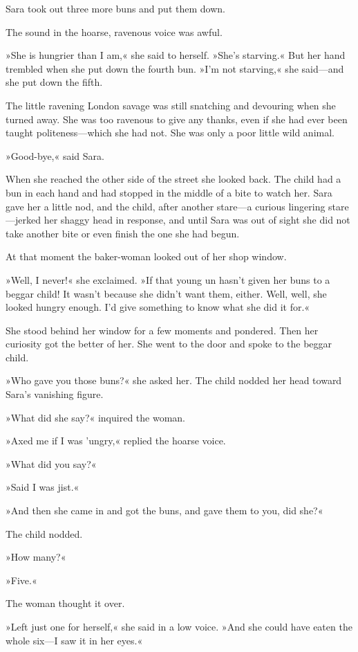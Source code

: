 Sara took out three more buns and put them down.

The sound in the hoarse, ravenous voice was awful.

»She is hungrier than I am,« she said to herself. »She's starving.« But her hand trembled when she put down the fourth bun. »I'm not starving,« she said—and she put down the fifth.

The little ravening London savage was still snatching and devouring when she turned away. She was too ravenous to give any thanks, even if she had ever been taught politeness—which she had not. She was only a poor little wild animal.

»Good-bye,« said Sara.

When she reached the other side of the street she looked back. The child had a bun in each hand and had stopped in the middle of a bite to watch her. Sara gave her a little nod, and the child, after another stare—a curious lingering stare—jerked her shaggy head in response, and until Sara was out of sight she did not take another bite or even finish the one she had begun.

At that moment the baker-woman looked out of her shop window.

»Well, I never!« she exclaimed. »If that young un hasn't given her buns to a beggar child! It wasn't because she didn't want them, either. Well, well, she looked hungry enough. I'd give something to know what she did it for.«

She stood behind her window for a few moments and pondered. Then her curiosity got the better of her. She went to the door and spoke to the beggar child.

»Who gave you those buns?« she asked her. The child nodded her head toward Sara's vanishing figure.

»What did she say?« inquired the woman.

»Axed me if I was 'ungry,« replied the hoarse voice.

»What did you say?«

»Said I was jist.«

»And then she came in and got the buns, and gave them to you, did she?«

The child nodded.

»How many?«

»Five.«

The woman thought it over.

»Left just one for herself,« she said in a low voice. »And she could have eaten the whole six—I saw it in her eyes.«


